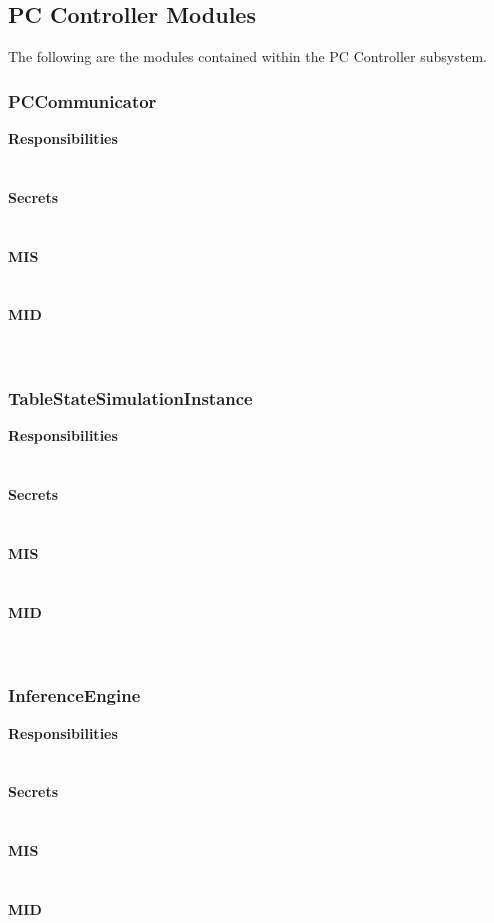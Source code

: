 \documentclass[titlepage]{article}
\begin{document}
\subsection{PC Controller Modules}
The following are the modules contained within the PC Controller subsystem.
\subsubsection{PCCommunicator}
\textbf{Responsibilities}\\
\\\\%
\textbf{Secrets}\\
\\\\%
\textbf{MIS}\\
\\\\%
\textbf{MID}\\
\\\\%
\subsubsection{TableStateSimulationInstance}
\textbf{Responsibilities}\\
\\\\%
\textbf{Secrets}\\
\\\\%
\textbf{MIS}\\
\\\\%
\textbf{MID}\\
\\\\%
\subsubsection{InferenceEngine}
\textbf{Responsibilities}\\
\\\\%
\textbf{Secrets}\\
\\\\%
\textbf{MIS}\\
\\\\%
\textbf{MID}\\
\\\\%
\end{document}
